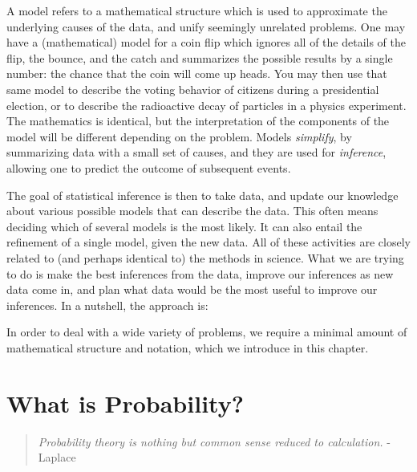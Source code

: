 A model refers to a mathematical structure which is used to approximate the underlying causes of the data, and unify seemingly unrelated problems.  One may have a (mathematical) model for a coin flip which ignores all of the details of the flip, the bounce, and the catch and summarizes the possible results by a single number: the chance that the coin will come up heads.  You may then use that same model to describe the voting behavior of citizens during a presidential election, or to describe the radioactive decay of particles in a physics experiment.  The mathematics is identical, but the interpretation of the components of the model will be different depending on the problem.  Models {\em simplify}, by summarizing data with a small set of causes, and they are used for {\em inference}, allowing one to predict the outcome of subsequent events.  

The goal of statistical inference is then to take data, and update our knowledge about various possible models that can describe the data.  This often means deciding which of several models is the most likely.  It can also entail the refinement of a single model, given the new data.  All of these activities are closely related to (and perhaps identical to) the methods in science.  What we are trying to do is make the best inferences from the data, improve our inferences as new data come in, and plan what data would be the most useful to improve our inferences.  In a nutshell, the approach is:


In order to deal with a wide variety of problems, we require a minimal amount of mathematical structure and notation, which we introduce in this chapter.

\section{What is Probability?}

\begin{quote}
{\em Probability theory is nothing but common sense reduced to calculation.} - Laplace
\end{quote}

